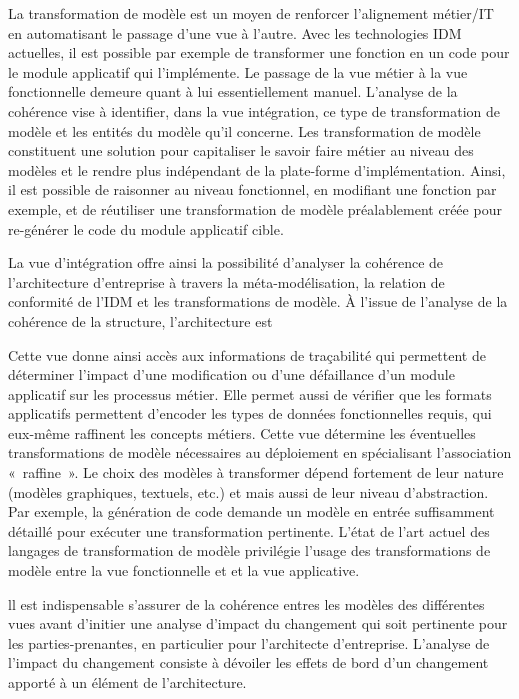 La transformation de modèle est un moyen de renforcer l'alignement métier/IT en automatisant le passage d'une vue
à l'autre. Avec les technologies IDM actuelles, il est possible par exemple de transformer une fonction en un code pour
le module applicatif qui l'implémente. Le passage de la vue métier à la vue fonctionnelle demeure quant à lui essentiellement
manuel. L'analyse de la cohérence vise à identifier, dans la vue intégration, ce type de transformation de modèle
et les entités du modèle qu'il concerne.
Les transformation de modèle constituent une solution pour capitaliser le savoir faire métier au niveau des modèles et le rendre
plus indépendant de la plate-forme d'implémentation. Ainsi, il est possible de raisonner au niveau fonctionnel, en modifiant une fonction par exemple, et de réutiliser une transformation de modèle préalablement créée pour re-générer le code du module applicatif cible.

La vue d'intégration offre ainsi la possibilité d'analyser la cohérence de l'architecture d'entreprise
à travers la méta-modélisation, la relation de conformité de l'IDM et les transformations de modèle.
À l'issue de l'analyse de la cohérence de la structure, l'architecture est 

Cette vue donne ainsi accès aux informations de traçabilité qui
permettent de déterminer l'impact d'une modification ou d'une défaillance d'un
module applicatif sur les processus métier. Elle permet aussi de vérifier que
les formats applicatifs permettent d'encoder les types de données fonctionnelles
requis, qui eux-même raffinent les concepts métiers. Cette vue détermine les
éventuelles transformations de modèle nécessaires au déploiement en spécialisant
l'association «~raffine~». Le choix des modèles à transformer dépend fortement
de leur nature (modèles graphiques, textuels, etc.) et mais aussi de leur niveau
d'abstraction. Par exemple, la génération de code demande un modèle en entrée
suffisamment détaillé pour exécuter une transformation pertinente. L'état de
l'art actuel des langages de transformation de modèle privilégie l'usage des
transformations de modèle entre la vue fonctionnelle et et la vue applicative.


ll est indispensable s'assurer de la cohérence
entres les modèles des différentes vues avant d'initier une analyse
d'impact du changement qui soit pertinente pour les parties-prenantes, en particulier
pour l'architecte d'entreprise. L'analyse de l'impact du
changement consiste à dévoiler les effets de bord d'un changement apporté à un
élément de l'architecture.

